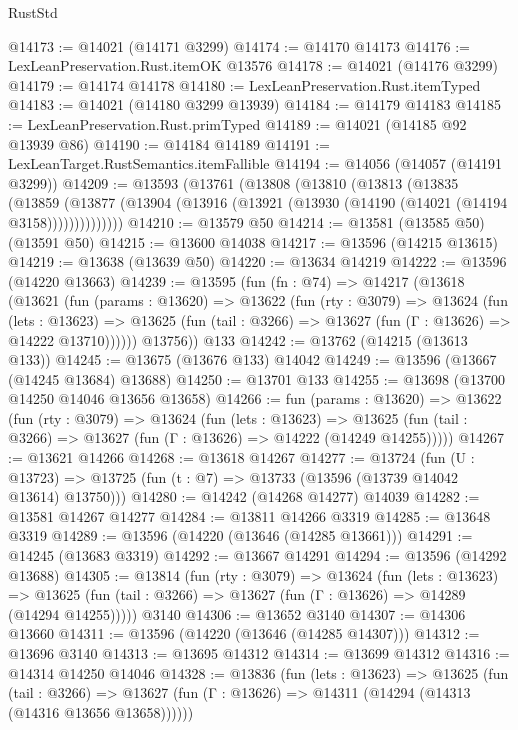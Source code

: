 \begin{lexlean}{RustStd}
\begin{coremodule}
@14173 := @14021 (@14171 @3299)
@14174 := @14170 @14173
@14176 := LexLeanPreservation.Rust.itemOK @13576
@14178 := @14021 (@14176 @3299)
@14179 := @14174 @14178
@14180 := LexLeanPreservation.Rust.itemTyped
@14183 := @14021 (@14180 @3299 @13939)
@14184 := @14179 @14183
@14185 := LexLeanPreservation.Rust.primTyped
@14189 := @14021 (@14185 @92 @13939 @86)
@14190 := @14184 @14189
@14191 := LexLeanTarget.RustSemantics.itemFallible
@14194 := @14056 (@14057 (@14191 @3299))
@14209 := @13593
    (@13761
      (@13808
        (@13810
          (@13813
            (@13835
              (@13859
                (@13877 (@13904 (@13916 (@13921 (@13930 (@14190 (@14021 (@14194 @3158))))))))))))))
@14210 := @13579 @50
@14214 := @13581 (@13585 @50) (@13591 @50)
@14215 := @13600 @14038
@14217 := @13596 (@14215 @13615)
@14219 := @13638 (@13639 @50)
@14220 := @13634 @14219
@14222 := @13596 (@14220 @13663)
@14239 := @13595
    (fun (fn : @74) =>
    @14217
      (@13618
        (@13621
          (fun (params : @13620) =>
          @13622
            (fun (rty : @3079) =>
            @13624
              (fun (lets : @13623) =>
              @13625 (fun (tail : @3266) => @13627 (fun (Γ : @13626) => @14222 @13710))))))
        @13756))
    @133
@14242 := @13762 (@14215 (@13613 @133))
@14245 := @13675 (@13676 @133) @14042
@14249 := @13596 (@13667 (@14245 @13684) @13688)
@14250 := @13701 @133
@14255 := @13698 (@13700 @14250 @14046 @13656 @13658)
@14266 := fun (params : @13620) =>
  @13622
    (fun (rty : @3079) =>
    @13624
      (fun (lets : @13623) =>
      @13625 (fun (tail : @3266) => @13627 (fun (Γ : @13626) => @14222 (@14249 @14255)))))
@14267 := @13621 @14266
@14268 := @13618 @14267
@14277 := @13724
    (fun (U : @13723) => @13725 (fun (t : @7) => @13733 (@13596 (@13739 @14042 @13614) @13750)))
@14280 := @14242 (@14268 @14277) @14039
@14282 := @13581 @14267 @14277
@14284 := @13811 @14266 @3319
@14285 := @13648 @3319
@14289 := @13596 (@14220 (@13646 (@14285 @13661)))
@14291 := @14245 (@13683 @3319)
@14292 := @13667 @14291
@14294 := @13596 (@14292 @13688)
@14305 := @13814
    (fun (rty : @3079) =>
    @13624
      (fun (lets : @13623) =>
      @13625 (fun (tail : @3266) => @13627 (fun (Γ : @13626) => @14289 (@14294 @14255)))))
    @3140
@14306 := @13652 @3140
@14307 := @14306 @13660
@14311 := @13596 (@14220 (@13646 (@14285 @14307)))
@14312 := @13696 @3140
@14313 := @13695 @14312
@14314 := @13699 @14312
@14316 := @14314 @14250 @14046
@14328 := @13836
    (fun (lets : @13623) =>
    @13625
      (fun (tail : @3266) =>
      @13627 (fun (Γ : @13626) => @14311 (@14294 (@14313 (@14316 @13656 @13658))))))

\end{coremodule}
\end{lexlean}
